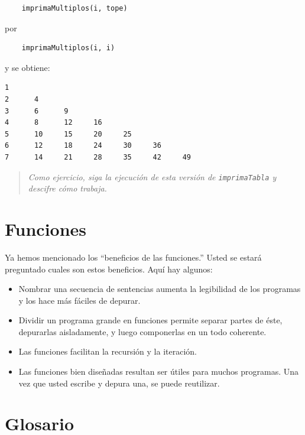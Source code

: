 \begin{verbatim}
    imprimaMultiplos(i, tope)
\end{verbatim}
%
por

\begin{verbatim}
    imprimaMultiplos(i, i)
\end{verbatim}
%
y se obtiene:

\beforeverb
\begin{verbatim}
1
2      4
3      6      9
4      8      12     16
5      10     15     20     25
6      12     18     24     30     36
7      14     21     28     35     42     49
\end{verbatim}
\afterverb
%
\begin{quote}
{\em Como ejercicio, siga la ejecución de esta versión de
\texttt{imprimaTabla} y descifre cómo trabaja.}
\end{quote}


\section{Funciones}

Ya hemos mencionado los  ``beneficios de las funciones.''  
Usted se estará preguntado cuales son estos beneficios. Aquí hay
algunos:

\begin{itemize}

\item Nombrar una secuencia de sentencias aumenta la legibilidad
de los programas y los hace más fáciles de depurar.

\item Dividir un programa grande en funciones permite separar partes
de éste, depurarlas aisladamente, y luego componerlas en un todo 
coherente.

\item Las funciones facilitan la recursión y la iteración.

\item Las funciones bien diseñadas resultan ser útiles para muchos
programas. Una vez que usted escribe y depura una, se puede 
reutilizar.

\end{itemize}


\section{Glosario}

